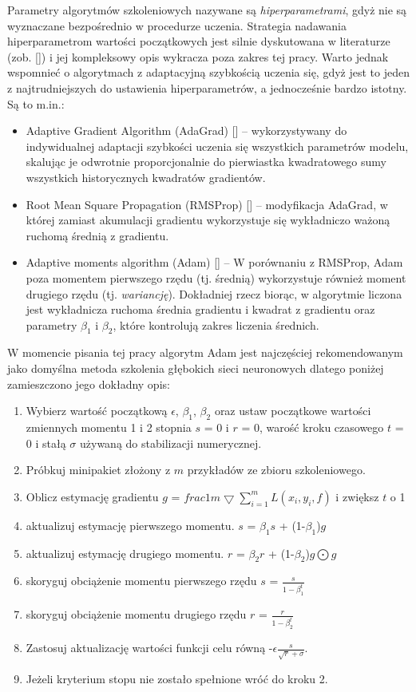 Parametry algorytmów szkoleniowych nazywane są \textit{hiperparametrami}, gdyż nie są wyznaczane bezpośrednio w procedurze uczenia. Strategia nadawania hiperparametrom wartości początkowych jest silnie dyskutowana w literaturze (zob. []) i jej kompleksowy opis wykracza poza zakres tej pracy. Warto jednak wspomnieć o algorytmach z adaptacyjną szybkością uczenia się, gdyż jest to jeden z najtrudniejszych do ustawienia hiperparametrów, a jednocześnie bardzo istotny. Są to m.in.:
\begin{itemize}
 \item Adaptive Gradient Algorithm (AdaGrad) [] -- wykorzystywany do indywidualnej adaptacji szybkości uczenia się wszystkich parametrów modelu, skalując je odwrotnie proporcjonalnie do pierwiastka kwadratowego sumy wszystkich historycznych kwadratów gradientów.
 \item Root Mean Square Propagation (RMSProp) [] -- modyfikacja AdaGrad, w której zamiast akumulacji gradientu wykorzystuje się wykładniczo ważoną ruchomą średnią z gradientu.
 \item Adaptive moments algorithm (Adam) [] -- W porównaniu z RMSProp, Adam poza momentem pierwszego rzędu (tj. średnią) wykorzystuje również moment drugiego rzędu (tj. \textit{wariancję}). Dokładniej rzecz biorąc, w algorytmie liczona jest wykładnicza ruchoma średnia gradientu i kwadrat z gradientu oraz parametry $\beta_1$ i $\beta_2$, które kontrolują zakres liczenia średnich.
\end{itemize}
W momencie pisania tej pracy algorytm Adam jest najczęściej rekomendowanym jako domyślna metoda szkolenia głębokich sieci neuronowych dlatego poniżej zamieszczono jego dokładny opis:
\begin{enumerate}
	\item Wybierz wartość początkową $\epsilon$, $\beta_1$, $\beta_2$ oraz ustaw początkowe wartości zmiennych momentu 1 i 2 stopnia $s$ = 0 i $r$ = 0, warość kroku czasowego $t$ = 0 i stałą $\sigma$ używaną do stabilizacji numerycznej.
	\item Próbkuj minipakiet złożony z $m$ przykładów ze zbioru szkoleniowego.
	\item Oblicz estymację gradientu $g$ = $frac{1}{m}\bigtriangledown \sum_{i=1}^{m}L(x_i, y_i, f)$ i zwiększ $t$ o 1
	\item aktualizuj estymację pierwszego momentu. $s$ = $\beta_1$$s$ + (1-$\beta_1$)$g$
	\item aktualizuj estymację drugiego momentu. $r$ = $\beta_2$$r$ + (1-$\beta_2$)$g\bigodot g$
	\item skoryguj obciążenie momentu pierwszego rzędu $s$ = $\frac{s}{1-\beta_1^t}$
	\item skoryguj obciążenie momentu drugiego rzędu $r$ = $\frac{r}{1-\beta_2^t}$
	\item Zastosuj aktualizację wartości funkcji celu równą -$\epsilon$$\frac{s}{\sqrt{r}+\sigma}$.
	\item Jeżeli kryterium stopu nie zostało spełnione wróć do kroku 2. 
\end{enumerate}

